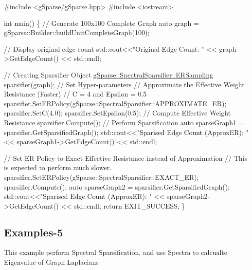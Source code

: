 \begin{DoxyCode}
\textcolor{preprocessor}{#include <gSparse/gSparse.hpp>}
\textcolor{preprocessor}{#include <iostream>}

\textcolor{keywordtype}{int} main()
\{
    \textcolor{comment}{// Generate 100x100 Complete Graph}
    \textcolor{keyword}{auto} graph = gSparse::Builder::buildUnitCompleteGraph(100);

    \textcolor{comment}{// Display original edge count}
    std::cout<<\textcolor{stringliteral}{"Original Edge Count: "} << graph->GetEdgeCount() << std::endl;

    \textcolor{comment}{// Creating Sparsifier Object}
    \mbox{\hyperlink{classg_sparse_1_1_spectral_sparsifier_1_1_e_r_sampling}{gSparse::SpectralSparsifier::ERSampling}} sparsifier(graph);
    \textcolor{comment}{// Set Hyper-parameters}
    \textcolor{comment}{// Approximate the Effective Weight Resistance (Faster)}
    \textcolor{comment}{// C = 4 and Epsilon = 0.5}
    sparsifier.SetERPolicy(gSparse::SpectralSparsifier::APPROXIMATE\_ER);
    sparsifier.SetC(4.0);
    sparsifier.SetEpsilon(0.5);
    \textcolor{comment}{// Compute Effective Weight Resistance}
    sparsifier.Compute();
    \textcolor{comment}{// Perform Sparsification }
    \textcolor{keyword}{auto} sparseGraph1 = sparsifier.GetSparsifiedGraph();
    std::cout<<\textcolor{stringliteral}{"Sparised Edge Count (ApproxER): "} << sparseGraph1->GetEdgeCount() << std::endl;

    \textcolor{comment}{// Set ER Policy to Exact Effective Resistance instead of Approximation}
    \textcolor{comment}{// This is expected to perform much slower.}
    sparsifier.SetERPolicy(gSparse::SpectralSparsifier::EXACT\_ER);
    sparsifier.Compute();
    \textcolor{keyword}{auto} sparseGraph2 = sparsifier.GetSparsifiedGraph();
    std::cout<<\textcolor{stringliteral}{"Sparised Edge Count (ApproxER): "} << sparseGraph2->GetEdgeCount() << std::endl;
    \textcolor{keywordflow}{return} EXIT\_SUCCESS;
\}
\end{DoxyCode}


\subsection*{Examples-\/5}

This example perform Spectral Sparsification, and use Spectra to calcualte Eigenvalue of Graph Laplacians


